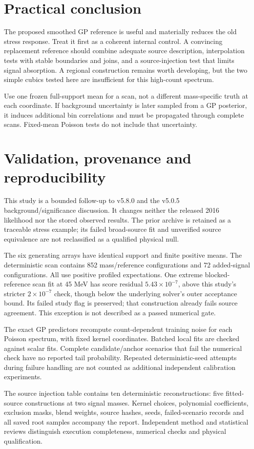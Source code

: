 \documentclass[11pt]{article}
\newcommand{\heading}[1]{\section*{\color{navy}#1}}
\begin{document}
\heading{Practical conclusion}
The proposed smoothed GP reference is useful and materially reduces the old stress response. Treat it first as a coherent internal control. A convincing replacement reference should combine adequate source description, interpolation tests with stable boundaries and joins, and a source-injection test that limits signal absorption. A regional construction remains worth developing, but the two simple cubics tested here are insufficient for this high-count spectrum.

Use one frozen full-support mean for a scan, not a different mass-specific truth at each coordinate. If background uncertainty is later sampled from a GP posterior, it induces additional bin correlations and must be propagated through complete scans. Fixed-mean Poisson tests do not include that uncertainty.

\clearpage
\heading{Validation, provenance and reproducibility}
This study is a bounded follow-up to v5.8.0 and the v5.0.5 background/significance discussion. It changes neither the released 2016 likelihood nor the stored observed results. The prior archive is retained as a traceable stress example; its failed broad-source fit and unverified source equivalence are not reclassified as a qualified physical null.

The six generating arrays have identical support and finite positive means. The deterministic scan contains 852 mass/reference configurations and 72 added-signal configurations. All use positive profiled expectations. One extreme blocked-reference scan fit at 45 MeV has score residual $5.43\times10^{-7}$, above this study's stricter $2\times10^{-7}$ check, though below the underlying solver's outer acceptance bound. Its failed study flag is preserved; that construction already fails source agreement. This exception is not described as a passed numerical gate.



The exact GP predictors recompute count-dependent training noise for each Poisson spectrum, with fixed kernel coordinates. Batched local fits are checked against scalar fits. Complete candidate/anchor scenarios that fail the numerical check have no reported tail probability. Repeated deterministic-seed attempts during failure handling are not counted as additional independent calibration experiments.

The source injection table contains ten deterministic reconstructions: five fitted-source constructions at two signal masses. Kernel choices, polynomial coefficients, exclusion masks, blend weights, source hashes, seeds, failed-scenario records and all saved root samples accompany the report. Independent method and statistical reviews distinguish execution completeness, numerical checks and physical qualification.
\end{document}
